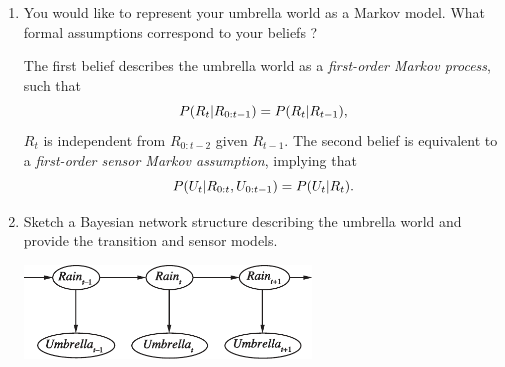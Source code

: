 \documentclass[11pt, a4paper]{article}
\begin{document}
\begin{enumerate}
    \item You would like to represent your umbrella world as a Markov model. What formal assumptions correspond to your beliefs ?
    
    \begin{solution}
        The first belief describes the umbrella world as a \emph{first-order Markov process}, such that
        \begin{equation*}
            P(R_t \vert R_{0:t-1}) = P(R_t \vert R_{t-1}),
        \end{equation*}
        \ie{} $R_t$ is independent from $R_{0:t - 2}$ given $R_{t-1}$. The second belief is equivalent to a \emph{first-order sensor Markov assumption}, implying that
        \begin{equation*}
            P(U_t \vert R_{0:t}, U_{0:t-1}) = P(U_t \vert R_{t}).
        \end{equation*}
    \end{solution}
    
    \item Sketch a Bayesian network structure describing the umbrella world and provide the transition and sensor models.
    
    \begin{solution}
        \vspace{1ex}
    
        \begin{center}
            \includegraphics[width=0.6\textwidth]{figures/e4_umbrella.pdf}
        \end{center}
        
        \vspace{1ex}


\end{solution}
\end{enumerate}
\end{document}
